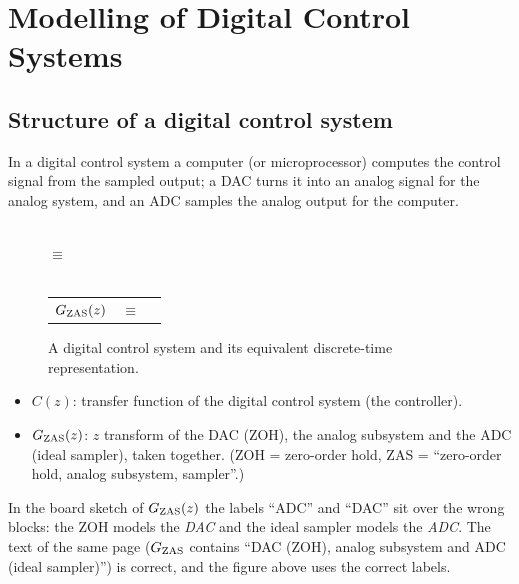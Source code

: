 \section{Modelling of Digital Control Systems}\label{sec:modelling}


\subsection{Structure of a digital control system}
In a digital control system a computer (or microprocessor) computes the control signal from the sampled
output; a DAC turns it into an analog signal for the analog system, and an ADC samples the analog output
for the computer.

\begin{figure}[ht]
\centering
\resizebox{0.86\linewidth}{!}{\figDigitalLoop}\\[4mm]
$\equiv$\\[2mm]
\\[4mm]
\begin{tabular}{@{}r@{\ }c@{\ }l@{}}
$G_{\mathrm{ZAS}}(z)$ & $\equiv$ & \raisebox{-0.9em}{\resizebox{0.5\linewidth}{!}{\figZASdef}}
\end{tabular}
\caption{A digital control system and its equivalent discrete-time representation.}\label{fig:digitalloop}
\end{figure}

\begin{itemize}
  \item $C(z)$: transfer function of the digital control system (the controller).
  \item $G_{\mathrm{ZAS}}(z)$: $z$ transform of the DAC (ZOH), the analog subsystem and the ADC (ideal sampler),
        taken together. (ZOH = zero-order hold, ZAS = ``zero-order hold, analog subsystem, sampler''.)
\end{itemize}

\begin{boardnote}
In the board sketch of $G_{\mathrm{ZAS}}(z)$ the labels ``ADC'' and ``DAC'' sit over the wrong blocks: the
ZOH models the \emph{DAC} and the ideal sampler models the \emph{ADC}. The text of the same page
($G_{\mathrm{ZAS}}$ contains ``DAC (ZOH), analog subsystem and ADC (ideal sampler)'') is correct, and the figure
above uses the correct labels.
\end{boardnote}

